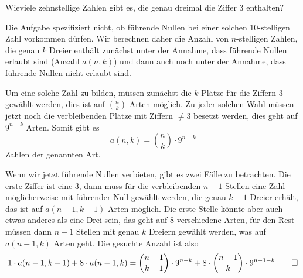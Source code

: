 Wieviele zehnstellige Zahlen gibt es, die genau dreimal die Ziffer
3 enthalten?

\begin{loesung}
Die Aufgabe spezifiziert nicht, ob führende Nullen bei einer solchen
10-stelligen Zahl
vorkommen dürfen. Wir berechnen daher die Anzahl von $n$-stelligen
Zahlen, die genau $k$ Dreier enthält zunächst unter der Annahme,
dass führende Nullen erlaubt sind (Anzahl $a(n,k)$) und dann auch
noch unter der Annahme, dass führende Nullen nicht erlaubt sind.

Um eine solche Zahl zu bilden, müssen zunächst die $k$ Plätze
für die Ziffern 3 gewählt werden, dies ist auf $\binom{n}{k}$
Arten möglich. Zu jeder solchen Wahl müssen jetzt noch die
verbleibenden Plätze mit Ziffern $\ne 3$ besetzt werden, dies
geht auf $9^{n-k}$ Arten. Somit gibt es
$$a(n,k)=\binom{n}{k}\cdot9^{n-k}$$
Zahlen der genannten Art.

Wenn wir jetzt führende Nullen verbieten, gibt es zwei Fälle zu
betrachten. Die erste Ziffer ist eine $3$, dann muss für die
verbleibenden $n-1$ Stellen eine Zahl möglicherweise mit führender
Null gewählt werden, die genau $k-1$ Dreier erhält, das ist auf $a(n-1,k-1)$
Arten möglich. Die erste Stelle könnte aber auch etwas anderes
als eine Drei sein, das geht auf $8$ verschiedene Arten, für den
Rest müssen dann $n-1$ Stellen mit genau $k$ Dreiern gewählt
werden, was auf $a(n-1,k)$ Arten geht. Die gesuchte Anzahl ist also
\[
1\cdot a(n-1,k-1) + 8\cdot a(n-1,k)=
\binom{n-1}{k-1}\cdot 9^{n-k}+8\cdot\binom{n-1}{k}\cdot 9^{n-1-k}
\qedhere
\]
\end{loesung}

